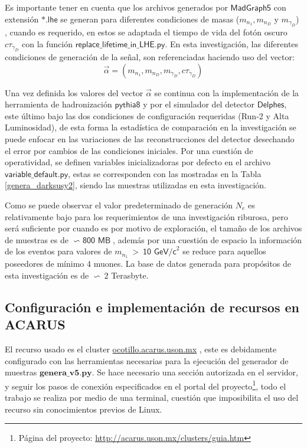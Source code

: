 Es importante tener en cuenta que los archivos generados por $\textsf{MadGraph5}$ con extensión $\textsf{*.lhe}$ se generan para diferentes condiciones de masas ($m_{n_1}, m_{n_D}$ y  $m_{\gamma_D}$)%
, cuando  es requerido, en estos se adaptada el tiempo de vida del fotón oscuro $c\tau_{\gamma_D}$ %
con la función $\textsf{replace\_lifetime\_in\_LHE.py}$. En esta investigación, las diferentes condiciones de generación de la señal, son referenciadas haciendo uso del vector:
\begin{equation}
\vec{\alpha} = (m_{n_1}, m_{n_D}, m_{\gamma_D}, c\tau_{\gamma_D})
\end{equation}

Una vez definida los valores del vector $\vec{\alpha}$ se continua con la implementación de la herramienta de hadronización $\textsf{pythia8}$ y por el simulador del detector $\textsf{Delphes}$, este último bajo las dos condiciones de configuración requeridas (Run-2 y Alta Luminosidad), de esta forma la estadística de comparación en la investigación se puede enfocar en las variaciones de las reconstrucciones del detector desechando el error por cambios de las condiciones iniciales. %
Por una cuestión de operatividad, se definen variables inicializadoras por defecto en el archivo $\textsf{variable\_default.py}$, estas se corresponden con las mostradas en la Tabla \ref{genera_darksusy2}, siendo las muestras utilizadas en esta investigación.

Como se puede observar el valor predeterminado de generación $N_e$ es relativamente bajo para los requerimientos de una investigación riburosa, pero será suficiente por cuando es por motivo de exploración, el tamaño de los archivos de muestras es de $\backsim\textsf{ 800 MB}$, además por una cuestión de espacio la información de los eventos para valores de $m_{n_1}~>~\textsf{10 GeV/c}^2$ %
se reduce para aquellos poseedores de mínimo 4 muones. La base de datos generada para propósitos de esta investigación es de $\backsim ~2$ Terasbyte.

\subsection{Configuración e implementación de recursos en ACARUS}

El recurso usado es el cluster \href{ocotillo.acarus.uson.mx}{ocotillo.acarus.uson.mx}%
, este es debidamente configurado con las herramientas necesarias para la ejecución del generador de muestras $\mathbf{genera
\_v5.py}$. Se hace necesario una sección autorizada en el servidor, y seguir los pasos de conexión especificados en el portal del proyecto\footnote{ Página del proyecto: \href{http://acarus.uson.mx/clusters/guia.htm}{http://acarus.uson.mx/clusters/guia.htm}}, todo el trabajo se realiza por medio de una terminal, cuestión que imposibilita el uso del recurso sin conocimientos previos de Linux.

